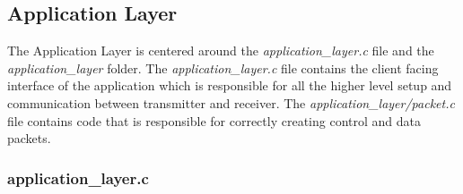 \documentclass[11pt,a4paper]{article}
\begin{document}
\subsection{Application Layer}

The Application Layer is centered around the \textit{application\_layer.c} file and the \textit{application\_layer} folder.
The \textit{application\_layer.c} file contains the client facing interface of the application which is responsible for all the higher level setup and communication between transmitter and receiver.
The \textit{application\_layer/packet.c} file contains code that is responsible for correctly creating control and data packets.

\subsubsection{application\_layer.c}
\end{document}

